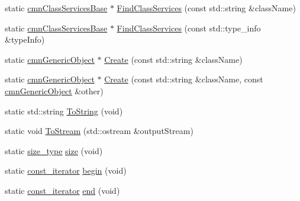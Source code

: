 \begin{DoxyCompactItemize}
\item 
static \hyperlink{classcmn_class_services_base}{cmn\+Class\+Services\+Base} $\ast$ \hyperlink{classcmn_class_register_a670426c761d6ef43df9bd67f4041b3da}{Find\+Class\+Services} (const std\+::string \&class\+Name)
\item 
static \hyperlink{classcmn_class_services_base}{cmn\+Class\+Services\+Base} $\ast$ \hyperlink{classcmn_class_register_a6ded0119eaa6ba31df685530ccf87d25}{Find\+Class\+Services} (const std\+::type\+\_\+info \&type\+Info)
\item 
static \hyperlink{classcmn_generic_object}{cmn\+Generic\+Object} $\ast$ \hyperlink{classcmn_class_register_af08b9d1e930098b7e760a3e13bd50cb0}{Create} (const std\+::string \&class\+Name)
\item 
static \hyperlink{classcmn_generic_object}{cmn\+Generic\+Object} $\ast$ \hyperlink{classcmn_class_register_ac96330fa28b74d90fb7625784fdbdee0}{Create} (const std\+::string \&class\+Name, const \hyperlink{classcmn_generic_object}{cmn\+Generic\+Object} \&other)
\item 
static std\+::string \hyperlink{classcmn_class_register_a29fdd14acb31a4fe05ce7fdbd463a31f}{To\+String} (void)
\item 
static void \hyperlink{classcmn_class_register_af25661aaf81242eae572112fc95b5b33}{To\+Stream} (std\+::ostream \&output\+Stream)
\item 
static \hyperlink{classcmn_class_register_ac90771194c85a9fff753d9d623071b01}{size\+\_\+type} \hyperlink{classcmn_class_register_a45356688a8fe87798fd8e2143d6f768c}{size} (void)
\item 
static \hyperlink{classcmn_class_register_aacfef62640c83b00064eba6c1f667e26}{const\+\_\+iterator} \hyperlink{classcmn_class_register_a97b89ca18a8fa10f083c000d259e8b82}{begin} (void)
\item 
static \hyperlink{classcmn_class_register_aacfef62640c83b00064eba6c1f667e26}{const\+\_\+iterator} \hyperlink{classcmn_class_register_afa8cb2f94da62294a96d7bfd1ba1185f}{end} (void)
\end{DoxyCompactItemize}
